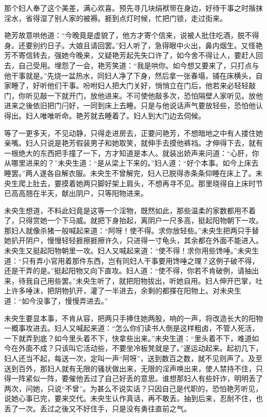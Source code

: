 \documentclass[a4paper,12pt,UTF8,twoside]{ctexbook}
\begin{document}
那个妇人奉了这个美差，满心欢喜。预先寻几块绢袱带在身边，好待干事之时揩抹淫水，省得湿了别人家的被褥。捱到点灯时候，忙把门锁，走过街来。

艳芳故意哄他道：“今晚竟是虚貌了，他方才寄个信来，说被人批住吃酒，脱不得身。还要别约日子。大娘且请回罢。”妇人听了，急得眼中火出，鼻内烟生。又怪艳芳不寄信转去，强她今晚来，又疑艳芳起先失口许了，如今舍不得让人，要赶人回去，自己受用。埋怨了一会，艳芳笑道：“我是哄你。如今想又要来了，只打点与他干事就是。”先烧一盆热水，同妇人净了下身，然后拿一张春塌，铺在床横头，自家睡了，好听他们干事。吩咐妇人把大门关好，悄悄立在门后，他若来必轻轻敲门，你听见敲一下就开门，放他进来。不可使他敲多次，恐怕隔壁人家听见。放他进来之後依旧把门闩好，一同到床上去睡。只是与他说话声气要放轻些，恐怕他认得出。妇人唯唯听命。艳芳就去睡着了。妇人到大门边去伺候。

等了一更多天，不见动静，只得走进房去，正要问艳芳，不想暗地之中有人搂住她亲嘴。妇人只说是艳芳假装男子和她取笑，就伸手去摸他裤裆。才伸得下去，就有一根绝大的东西把手撞了一下，方才知道是本人。就装出娇声来问道：“心肝，你从哪里进来的？”未央生道：“是从梁上下来的。”妇人道：“好个本事。如今上床去睡罢。”两人遂各自解衣服。未央生不曾解完，妇人已脱得赤条条仰睡在床上了。未央生爬上肚去，要摸着她两只脚好架上肩头，不想再寻不见。那里晓得自上床时节已高高翘在半天，献出阴户，只等阳物进来。

未央生想道，不料此妇竟是这等一个淫物，既然如此，那些温柔的家数都用不着了，只得赏她一个下马威。就把下身抬起，离阴户一尺多高，挺起阳物朝下一攻。那妇人就像杀猪一般喊起来道：“阿呀！使不得。求你放轻些。”未央生把两只手替她扒开阴户，慢慢轻轻捱擦捱擦许久，只进得一寸龟头，其余都在外面不能进入。未央生又挺起阳物朝里一攻。妇人又喊起来道：“使不得！求你用些馋唾。”未央生道：“只有弄小官用着那件东西，岂有同妇人干事要用馋唾之理？这例子破不得，还是干弄的是。”挺起阳物又向下直攻。妇人道：“使不得，你若不肯破例，请抽出来，待我自己用些罢。”未央生听了，就把阳物拔出，听她自用。妇人伸开巴掌，吐上许多唾沫，把阴物扒开，灌了一半进去，余剩的都搽在阳物上。对未央生道：“如今没事了，慢慢弄进去。”

未央生要显本事，不肯从容，把两只手捧住她两股，响的一声，将改造长大的阳物一概事攻进去。妇人又喊起来道：“怎么你们读书人倒是这样粗卤，不管人死活，一下就弄到底？如今里头着不下，快拿些出来。”未央生道：“里头着不下，难道如今在外面不成？只该叫它活动些，不要坐冷板凳就是了。”遂运动起来。起初几下，妇人还当不起，每送一次，定叫一声“阿呀”，送到数百之数，就不见则声了。及至送到百外，那妇人就有无限的骚状做出来，无限的淫声唤出来，使人禁持不住，只得一阵紧似一阵，要催他丢过了自己好丢的意思。谁想那妇人有些奸诈，明明丢了两次，问她，只说“不曾”。为甚么不说实话？只因自己是代职的，恐怕艳芳听见，说她心事已完，要来交代。未央生认作真话，再不敢丢。抽到后来，忍耐不住，也丢了一次。丢过之後又不好住手，只是没有勇往直前之气。
\end{document}

